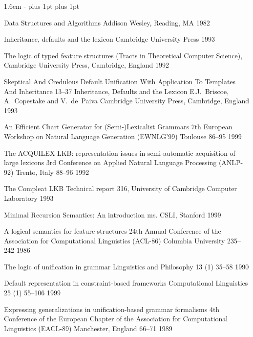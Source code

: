 \documentclass[12pt]{report}
\begin{document}
\begin{list}{}
   {\leftmargin 1.6em
    \itemindent -\leftmargin
    \itemsep 0pt plus 1pt
    \parsep 0pt plus 1pt}

{Data Structures and Algorithms}
{Addison Wesley, Reading, MA}
{1982}

{Inheritance, defaults and the lexicon}
{Cambridge University Press}
{1993}

{The logic of typed feature structures}
{(Tracts in Theoretical Computer Science), Cambridge University Press,
  Cambridge, England} 
{1992}

           {Skeptical And Credulous Default Unification With
Application To Templates And Inheritance}
    {13--37}
    {Inheritance, Defaults and the Lexicon}
    {E.J.~Briscoe, A.~Copestake and V.~de~Paiva}
    {Cambridge University Press, Cambridge, England}
    {1993}

{An Efficient Chart Generator for (Semi-)Lexicalist Grammars}
{7th European Workshop on Natural Language
Generation (EWNLG'99)}
{Toulouse} 
{86--95}
{1999}

{The ACQUILEX LKB: representation issues in semi-automatic
acquisition of large lexicons}
{3rd Conference on Applied Natural Language Processing (ANLP-92)}
{Trento, Italy}
{88--96}
{1992}

{The Compleat LKB}
{Technical report 316,
University of Cambridge Computer Laboratory}
{1993}

{Minimal Recursion Semantics: An introduction}
{ms. CSLI, Stanford}
{1999}

{A logical semantics for feature structures}
{24th Annual Conference of the Association for Computational
Linguistics (ACL-86)}
{Columbia University}
{235--242}
{1986}

{The logic of unification in grammar}
{Linguistics and Philosophy}
{13 (1)}
{35--58}
{1990}

{Default representation in constraint-based frameworks}
{Computational Linguistics}
{25 (1)}
{55--106}
{1999}

  {Expressing generalizations in unification-based grammar formalisms}
  {4th Conference of the European Chapter of the Association 
for Computational Linguistics (EACL-89)}
  {Manchester, England}
  {66--71}
  {1989}


\end{list}
\end{document}
